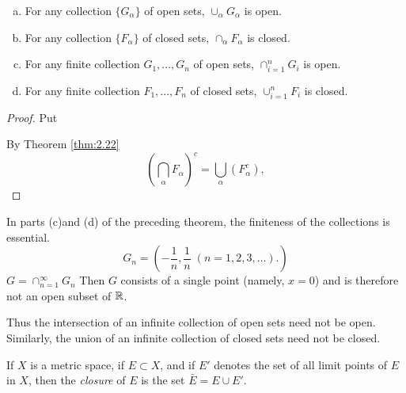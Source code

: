 \begin{thm}
    \label{thm:2.24}
    \begin{enumerate}[(a)]
        \item For any collection $\{G_\alpha\}$ of open sets,  $\cup_\alpha G_\alpha$ is open.
        \item For any collection $\{F_\alpha\}$ of closed sets, $\cap_\alpha F_\alpha$ is closed.
        \item For any finite collection $G_1, ..., G_n$ of open sets, $\cap_{i=1}^n G_i$ is open.
        \item For any finite collection $F_1, ..., F_n$ of closed sets, $\cup_{i=1}^n F_i$ is closed.
    \end{enumerate}
\end{thm}

\begin{proof}
    Put 

    By Theorem \ref{thm:2.22}
    \begin{equation}
        \label{eq:2.21}
        \left( \bigcap_\alpha F_\alpha \right)^c = 
        \bigcup_\alpha \left( F_\alpha^c \right),
    \end{equation}
\end{proof}


\begin{myExample}
    In parts (c)and (d) of the preceding theorem, the finiteness of the collections is essential.
    \begin{equation*}
        G_n = \left(-\frac{1}{n}, \frac{1}{n} \; (n=1,2,3,\dots). \right)
    \end{equation*}
    $G = \cap_{n=1}^\infty G_n$
    Then $G$ consists of a single point (namely, $x = 0$) and is therefore not an open subset of ${\protect\mathbb R}$.
    
    Thus the intersection of an infinite collection of open sets need not be open. Similarly, the union of an infinite collection of closed sets need not be closed.
\end{myExample}

\begin{myDef}
    \label{myDef:2.26}
    If $X$ is a metric space, if $E \subset X$, and if $E'$ denotes the set of all limit points of $E$ in $X$, then the \emph{closure} of $E$ is the set $\bar{E}=E \cup E'$.
\end{myDef}

